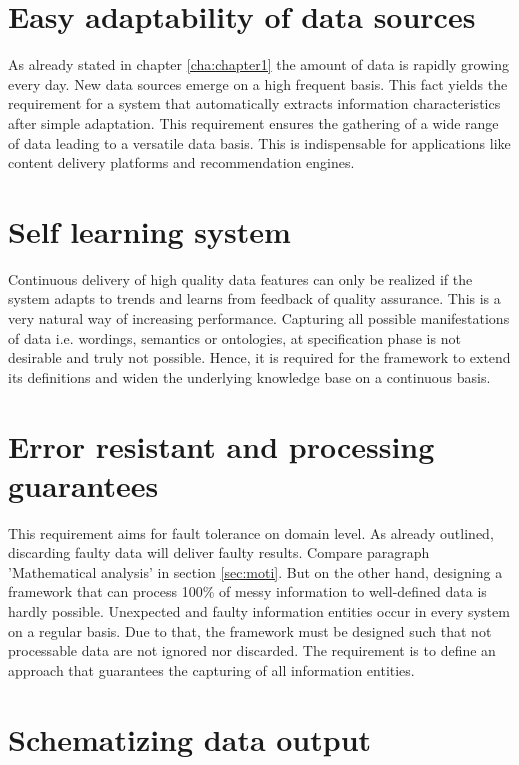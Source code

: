 \section{Easy adaptability of data sources}

As already stated in chapter \ref{cha:chapter1} the amount of data is rapidly growing every day. New data sources emerge on a high frequent basis. This fact yields the requirement for a system that automatically extracts information characteristics after simple adaptation. This requirement ensures the gathering of a wide range of data leading to a versatile data basis. This is indispensable for applications like content delivery platforms and recommendation engines.

\section{Self learning system}

Continuous delivery of high quality data features can only be realized if the system adapts to trends and learns from feedback of quality assurance. This is a very natural way of increasing performance. Capturing all possible manifestations of data i.e. wordings, semantics or ontologies, at specification phase is not desirable and truly not possible. Hence, it is required for the framework to extend its definitions and widen the underlying knowledge base on a continuous basis. 

\section{Error resistant and processing guarantees \label{sec:error}}

This requirement aims for fault tolerance on domain level. As already outlined, discarding faulty data will deliver faulty results. Compare paragraph 'Mathematical analysis' in section \ref{sec:moti}. But on the other hand, designing a framework that can process 100\% of messy information to well-defined data is hardly possible. Unexpected and faulty information entities occur in every system on a regular basis. Due to that, the framework must be designed such that not processable data are not ignored nor discarded. The requirement is to define an approach that guarantees the capturing of all information entities.

\section{Schematizing data output}

